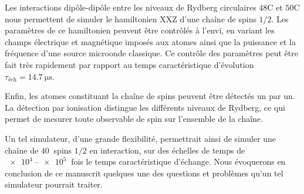 Les interactions dipôle-dipôle entre les niveaux de Rydberg circulaires $\mathrm{48C}$ et $\mathrm{50C}$ nous permettent de simuler le hamiltonien XXZ d'une chaîne de spins $1/2$.
Les paramètres de ce hamiltonien peuvent être contrôlés à l'envi, en variant les champs électrique et magnétique imposés aux atomes ainsi que la puissance et la fréquence d'une source microonde classique.
Ce contrôle des paramètres peut être fait très rapidement par rapport au temps caractéristique d'évolution $\tau_{\text{\'ech}} = \SI{14.7}{\us}$.

Enfin, les atomes constituant la chaîne de spins peuvent être détectés un par un.
La détection par ionisation distingue les différents niveaux de Rydberg, ce qui permet de mesurer toute observable de spin sur l'ensemble de la chaîne.

Un tel simulateur, d'une grande flexibilité, permettrait ainsi de simuler une chaîne de $\SI{40}{}$ spins $1/2$ en interaction, sur des échelles de temps de $\SIrange{e4}{e5}{}$ fois le temps caractéristique d'échange.
Nous évoquerons en conclusion de ce manuscrit quelques une des questions et problèmes qu'un tel simulateur pourrait traiter.














